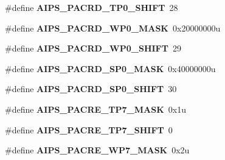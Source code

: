 \begin{DoxyCompactItemize}
\item 
\#define {\bfseries A\+I\+P\+S\+\_\+\+P\+A\+C\+R\+D\+\_\+\+T\+P0\+\_\+\+S\+H\+I\+FT}~28\hypertarget{group__AIPS__Register__Masks_ga393a80798d513d45177147291c0d3da6}{}\label{group__AIPS__Register__Masks_ga393a80798d513d45177147291c0d3da6}

\item 
\#define {\bfseries A\+I\+P\+S\+\_\+\+P\+A\+C\+R\+D\+\_\+\+W\+P0\+\_\+\+M\+A\+SK}~0x20000000u\hypertarget{group__AIPS__Register__Masks_ga71e04e5cf8734bccacc3a6611df85704}{}\label{group__AIPS__Register__Masks_ga71e04e5cf8734bccacc3a6611df85704}

\item 
\#define {\bfseries A\+I\+P\+S\+\_\+\+P\+A\+C\+R\+D\+\_\+\+W\+P0\+\_\+\+S\+H\+I\+FT}~29\hypertarget{group__AIPS__Register__Masks_ga673fcdf4f6746f32014d13feb92a0944}{}\label{group__AIPS__Register__Masks_ga673fcdf4f6746f32014d13feb92a0944}

\item 
\#define {\bfseries A\+I\+P\+S\+\_\+\+P\+A\+C\+R\+D\+\_\+\+S\+P0\+\_\+\+M\+A\+SK}~0x40000000u\hypertarget{group__AIPS__Register__Masks_ga4b4b9b7c34e414f70b7bec814e4d4188}{}\label{group__AIPS__Register__Masks_ga4b4b9b7c34e414f70b7bec814e4d4188}

\item 
\#define {\bfseries A\+I\+P\+S\+\_\+\+P\+A\+C\+R\+D\+\_\+\+S\+P0\+\_\+\+S\+H\+I\+FT}~30\hypertarget{group__AIPS__Register__Masks_ga9fdb80a8a443be4b480e4174d9f94866}{}\label{group__AIPS__Register__Masks_ga9fdb80a8a443be4b480e4174d9f94866}

\item 
\#define {\bfseries A\+I\+P\+S\+\_\+\+P\+A\+C\+R\+E\+\_\+\+T\+P7\+\_\+\+M\+A\+SK}~0x1u\hypertarget{group__AIPS__Register__Masks_ga09a9f605281c2e4b7ddb70e8b8bdb14d}{}\label{group__AIPS__Register__Masks_ga09a9f605281c2e4b7ddb70e8b8bdb14d}

\item 
\#define {\bfseries A\+I\+P\+S\+\_\+\+P\+A\+C\+R\+E\+\_\+\+T\+P7\+\_\+\+S\+H\+I\+FT}~0\hypertarget{group__AIPS__Register__Masks_gadef361b9d8de86e86f2222359399e2b4}{}\label{group__AIPS__Register__Masks_gadef361b9d8de86e86f2222359399e2b4}

\item 
\#define {\bfseries A\+I\+P\+S\+\_\+\+P\+A\+C\+R\+E\+\_\+\+W\+P7\+\_\+\+M\+A\+SK}~0x2u\hypertarget{group__AIPS__Register__Masks_ga4826af7b2acfd85ab3b91cde438d040f}{}\label{group__AIPS__Register__Masks_ga4826af7b2acfd85ab3b91cde438d040f}


\end{DoxyCompactItemize}
